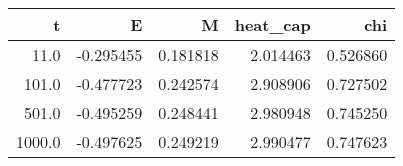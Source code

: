 \begin{tabular}{rrrrr}
\toprule
      t &         E &         M &  heat_cap &       chi \\
\midrule
   11.0 & -0.295455 &  0.181818 &  2.014463 &  0.526860 \\
  101.0 & -0.477723 &  0.242574 &  2.908906 &  0.727502 \\
  501.0 & -0.495259 &  0.248441 &  2.980948 &  0.745250 \\
 1000.0 & -0.497625 &  0.249219 &  2.990477 &  0.747623 \\
\bottomrule
\end{tabular}
